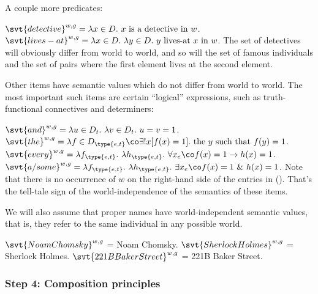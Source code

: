 %
A couple more predicates:

\pex \a
$\svt{detective}^{w,g} = \lambda x \in D.\ x \mbox{ is a detective in } w$. \a
$\svt{lives-at}^{w,g} = \lambda x \in D.\ \lambda y \in D.\ y \mbox{ lives-at }
x \mbox{ in } w $. \xe
%
The set of detectives will obviously differ from world to world, and so will the
set of famous individuals and the set of pairs where the first element lives at
the second element.

\clearpage
Other items have semantic values which do not differ from world to world. The
most important such items are certain ``logical'' expressions, such as
truth-functional connectives and determiners:

\pex
\a $\svt{and}^{w,g} = \lambda u \in D_t.\ \lambda v \in D_t.\ u=v=1
$.
\a $\svt{the}^{w,g} = \lambda f \in D_{\type{e,t}}\co \exists !
x[f(x) = 1]. \mbox{ the } y \mbox{ such that } f(y) = 1$.
\a $\svt{every}^{w,g} = \lambda f_{\type{e,t}}.\ \lambda
h_{\type{e,t}}.\ \forall x_e\co f(x) = 1 \rightarrow h(x) = 1 $.
\a $\svt{a/some}^{w,g} = \lambda f_{\type{e,t}}.\ \lambda
h_{\type{e,t}}.\ \exists x_e\co f(x) = 1\ \&\ h(x) = 1 $.
\xe
%
Note that there is no occurrence of $w$ on the right-hand side of the entries in
(\lastx). That's the tell-tale sign of the world-independence of the semantics of
these items.

%
We will also assume that proper names have world-independent semantic values,
that is, they refer to the same individual in any possible world.

\pex
\a $\svt{Noam Chomsky}^{w,g}$ = Noam Chomsky. 
\a $\svt{Sherlock Holmes}^{w,g}$ = Sherlock Holmes. 
\a $\svt{221B Baker Street}^{w,g}$ = 221B Baker Street.
\xe

\subsubsection{Step 4: Composition principles} \label{sec:comp-princ}

